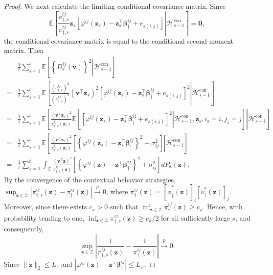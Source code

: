 \documentclass[12pt]{article}
\begin{document}
\begin{proof}
We next calculate the limiting conditional covariance matrix. Since
\[
\mathbb E
\left[
\left.
\frac{
a_{\dagger,s}^{ij}
}{
\pi_{\dagger,s}^{ij}
}
\bm z_s
\left[
\varphi^{ij}(\bm z_s)
-
\bm z_s^\top\bm\beta_\dagger^{ij}
+ e_{s(i,j)}
\right]
\right|
\mathcal H_{s-1}^{\mathrm{con}}
\right]
= \bm 0,
\]
the conditional covariance matrix is equal to the conditional second-moment matrix. Then
\begin{align*}
&\frac1t
\sum_{s=1}^t
\mathbb E
\left[
\left.
\left\{
D_s^{ij}(\bm v)
\right\}^2
\right|
\mathcal H_{s-1}^{\mathrm{con}}
\right] \\
=&
\frac1t
\sum_{s=1}^t
\mathbb E
\left[
\left.
\frac{(a_{\dagger,s}^{ij})^2}{(\pi_{\dagger,s}^{ij})^2}
(\bm v^\top\bm z_s)^2
\left[
\varphi^{ij}(\bm z_s)
-
\bm z_s^\top\bm\beta_\dagger^{ij}
+
e_{s(i,j)}
\right]^2
\right|
\mathcal H_{s-1}^{\mathrm{con}}
\right] \\
=& \frac1t
\sum_{s=1}^t
\mathbb E
\left[
\left.
\frac{
(\bm v^\top\bm z_s)^2}{\pi_{\dagger,s}^{ij}(\bm z_s)}
\mathbb E
\left[
\left.
\left[
\varphi^{ij}(\bm z_s)
-
\bm z_s^\top\bm\beta_\dagger^{ij}
+
e_{s(i,j)}
\right]^2
\right|
\mathcal H_{s-1}^{\mathrm{con}},
\bm z_s,
i_s=i,
j_s=j
\right]
\right|
\mathcal H_{s-1}^{\mathrm{con}}
\right] \\
=& \frac1t
\sum_{s=1}^t
\mathbb E
\left[
\left.
\frac{
(\bm v^\top\bm z_s)^2}{\pi_{\dagger,s}^{ij}(\bm z_s)}
\left[
\left\{
\varphi^{ij}(\bm z_s)
-
\bm z_s^\top\bm\beta_\dagger^{ij}
\right\}^2
+
\sigma_{ij}^2
\right]
\right|
\mathcal H_{s-1}^{\mathrm{con}}
\right] \\
=& \frac1t
\sum_{s=1}^t
\int_{\mathcal Z}
\frac{
(\bm v^\top\bm z)^2
}{
\pi_{\dagger,s}^{ij}(\bm z)
}
\left[
\left\{
\varphi^{ij}(\bm z)
-
\bm z^\top\bm\beta_\dagger^{ij}
\right\}^2
+
\sigma_{ij}^2
\right]
dP_{\bm z}(\bm z).
\end{align*}
By the convergence of the contextual behavior strategies, $\sup_{\bm z\in\mathcal Z}\left|\pi_{\dagger,s}^{ij}(\bm z)-\pi_\dagger^{ij}(\bm z)\right|\stackrel{p}{\to}0$,
where $\pi_\dagger^{ij}(\bm z)=[\widetilde{\phi}_\dagger^\ast(\bm z)]_i[\widetilde{\nu}_\dagger^\ast(\bm z)]_j$.
Moreover, since there exists $c_\pi>0$ such that $\inf_{\bm z\in\mathcal Z} \pi_\dagger^{ij}(\bm z) \ge c_\pi$.
Hence, with probability tending to one, $\inf_{\bm z\in\mathcal Z}\pi_{\dagger,s}^{ij}(\bm z)\ge {c_\pi}/{2}$ for all sufficiently large $s$, and consequently,
\[
\sup_{\bm z\in\mathcal Z}
\left|
\frac1{\pi_{\dagger,s}^{ij}(\bm z)}
-
\frac1{\pi_\dagger^{ij}(\bm z)}
\right|
\stackrel{p}{\to} 0.
\]
Since $\|\bm z\|_2\le L_z$ and $\left| \varphi^{ij}(\bm z) - \bm z^\top\bm\beta_\dagger^{ij} \right| \le L_\varphi$,

\end{proof}
\end{document}

